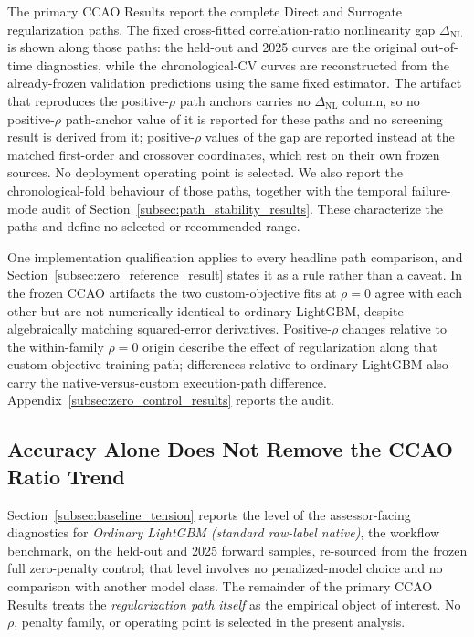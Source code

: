 \documentclass[10pt]{article}
\theoremstyle{definition}
\newcommand{\1}{\mathbf{1}}
\begin{document}
The primary CCAO Results report the complete Direct and Surrogate regularization paths. The fixed cross-fitted correlation-ratio nonlinearity gap $\Delta_{\mathrm{NL}}$ is shown along those paths: the held-out and 2025 curves are the original out-of-time diagnostics, while the chronological-CV curves are reconstructed from the already-frozen validation predictions using the same fixed estimator. The artifact that reproduces the positive-$\rho$ path anchors carries no $\Delta_{\mathrm{NL}}$ column, so no positive-$\rho$ path-anchor value of it is reported for these paths and no screening result is derived from it; positive-$\rho$ values of the gap are reported instead at the matched first-order and crossover coordinates, which rest on their own frozen sources. No deployment operating point is selected.
We also report the chronological-fold behaviour of those paths, together with the temporal failure-mode audit of Section~\ref{subsec:path_stability_results}. These characterize the paths and define no selected or recommended range.

One implementation qualification applies to every headline path comparison, and Section~\ref{subsec:zero_reference_result} states it as a rule rather than a caveat. In the frozen CCAO artifacts the two custom-objective fits at $\rho=0$ agree with each other but are not numerically identical to ordinary LightGBM, despite algebraically matching squared-error derivatives. Positive-$\rho$ changes relative to the within-family $\rho=0$ origin describe the effect of regularization along that custom-objective training path; differences relative to ordinary LightGBM also carry the native-versus-custom execution-path difference. Appendix~\ref{subsec:zero_control_results} reports the audit.

\subsection{Accuracy Alone Does Not Remove the CCAO Ratio Trend}
\label{subsec:ccao_baseline_results}

Section~\ref{subsec:baseline_tension} reports the level of the assessor-facing
diagnostics for \emph{Ordinary LightGBM (standard raw-label native)}, the workflow benchmark, on the
held-out and 2025 forward samples, re-sourced from the frozen full zero-penalty control; that level
involves no penalized-model choice and no comparison with another model class. The remainder of the
primary CCAO Results treats the \emph{regularization path itself} as the empirical
object of interest. No $\rho$, penalty family, or operating point is selected in the
present analysis.
\end{document}
